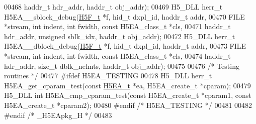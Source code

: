\begin{DoxyCode}
00468     haddr\_t hdr\_addr, haddr\_t obj\_addr);
00469 H5\_DLL herr\_t H5EA\_\_sblock\_debug(\hyperlink{struct_h5_f__t}{H5F\_t} *f, hid\_t dxpl\_id, haddr\_t addr,
00470     FILE *stream, \textcolor{keywordtype}{int} indent, \textcolor{keywordtype}{int} fwidth, \textcolor{keyword}{const} H5EA\_class\_t *cls,
00471     haddr\_t hdr\_addr, \textcolor{keywordtype}{unsigned} sblk\_idx, haddr\_t obj\_addr);
00472 H5\_DLL herr\_t H5EA\_\_dblock\_debug(\hyperlink{struct_h5_f__t}{H5F\_t} *f, hid\_t dxpl\_id, haddr\_t addr,
00473     FILE *stream, \textcolor{keywordtype}{int} indent, \textcolor{keywordtype}{int} fwidth, \textcolor{keyword}{const} H5EA\_class\_t *cls,
00474     haddr\_t hdr\_addr, \textcolor{keywordtype}{size\_t} dblk\_nelmts, haddr\_t obj\_addr);
00475 
00476 \textcolor{comment}{/* Testing routines */}
00477 \textcolor{preprocessor}{#ifdef H5EA\_TESTING}
00478 H5\_DLL herr\_t H5EA\_get\_cparam\_test(\textcolor{keyword}{const} \hyperlink{struct_h5_e_a__t}{H5EA\_t} *ea, H5EA\_create\_t *cparam);
00479 H5\_DLL \textcolor{keywordtype}{int} H5EA\_cmp\_cparam\_test(\textcolor{keyword}{const} H5EA\_create\_t *cparam1, \textcolor{keyword}{const} H5EA\_create\_t *cparam2);
00480 \textcolor{preprocessor}{#endif }\textcolor{comment}{/* H5EA\_TESTING */}\textcolor{preprocessor}{}
00481 
00482 \textcolor{preprocessor}{#endif }\textcolor{comment}{/* \_H5EApkg\_H */}\textcolor{preprocessor}{}
00483 
\end{DoxyCode}
